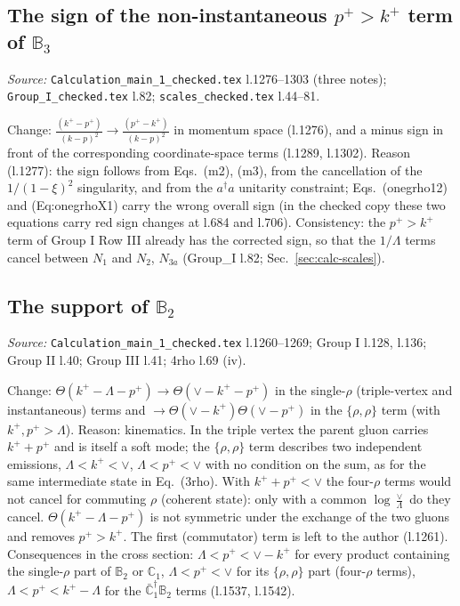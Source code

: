 \documentclass[10pt]{article}
\def\mf#1{\mathbb{#1}}
\begin{document}
\subsection{The sign of the non-instantaneous $p^{+}>k^{+}$ term of $\mf{B}_{3}$}\label{sec:calc-B3}
\noindent\emph{Source:} \texttt{Calculation\_main\_1\_checked.tex} l.1276--1303 (three notes); \texttt{Group\_I\_checked.tex} l.82; \texttt{scales\_checked.tex} l.44--81.

\noindent Change: $\frac{(k^{+}-p^{+})}{(k-p)^{2}}\to\frac{(p^{+}-k^{+})}{(k-p)^{2}}$ in momentum space (l.1276), and a minus sign in front of the corresponding coordinate-space terms (l.1289, l.1302). Reason (l.1277): the sign follows from Eqs.~(m2), (m3), from the cancellation of the $1/(1-\xi)^{2}$ singularity, and from the $a^{\dagger}a$ unitarity constraint; Eqs.~(onegrho12) and (Eq:onegrhoX1) carry the wrong overall sign (in the checked copy these two equations carry red sign changes at l.684 and l.706). Consistency: the $p^{+}>k^{+}$ term of Group I Row III already has the corrected sign, so that the $1/\Lambda$ terms cancel between $N_{1}$ and $N_{2}$, $N_{3a}$ (Group\_I l.82; Sec.~\ref{sec:calc-scales}).

\subsection{The support of $\mf{B}_{2}$}\label{sec:calc-B2}
\noindent\emph{Source:} \texttt{Calculation\_main\_1\_checked.tex} l.1260--1269; Group I l.128, l.136; Group II l.40; Group III l.41; 4rho l.69 (iv).

\noindent Change: $\Theta(k^{+}-\Lambda-p^{+})\to\Theta(\vee-k^{+}-p^{+})$ in the single-$\rho$ (triple-vertex and instantaneous) terms and $\to\Theta(\vee-k^{+})\Theta(\vee-p^{+})$ in the $\{\rho,\rho\}$ term (with $k^{+},p^{+}>\Lambda$). Reason: kinematics. In the triple vertex the parent gluon carries $k^{+}+p^{+}$ and is itself a soft mode; the $\{\rho,\rho\}$ term describes two independent emissions, $\Lambda<k^{+}<\vee$, $\Lambda<p^{+}<\vee$ with no condition on the sum, as for the same intermediate state in Eq.~(3rho). With $k^{+}+p^{+}<\vee$ the four-$\rho$ terms would not cancel for commuting $\rho$ (coherent state): only with a common $\log\frac{\vee}{\Lambda}$ do they cancel. $\Theta(k^{+}-\Lambda-p^{+})$ is not symmetric under the exchange of the two gluons and removes $p^{+}>k^{+}$. The first (commutator) term is left to the author (l.1261). Consequences in the cross section: $\Lambda<p^{+}<\vee-k^{+}$ for every product containing the single-$\rho$ part of $\mf{B}_{2}$ or $\mf{C}_{1}$, $\Lambda<p^{+}<\vee$ for its $\{\rho,\rho\}$ part (four-$\rho$ terms), $\Lambda<p^{+}<k^{+}-\Lambda$ for the $\bar{\mf{C}}^{\dagger}_{1}\mf{B}_{2}$ terms (l.1537, l.1542).
\end{document}
